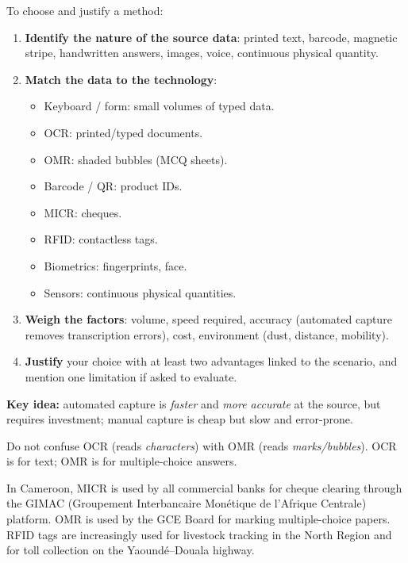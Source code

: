 \documentclass[11pt]{article}
\newcommand{\cle}[1]{{\popxbold\color{popdark}#1}}
\begin{document}
\begin{methode}
To choose and justify a method:
\begin{enumerate}
\item \textbf{Identify the nature of the source data}: printed text, barcode, magnetic stripe, handwritten answers, images, voice, continuous physical quantity.
\item \textbf{Match the data to the technology}:
\begin{itemize}
\item \cle{Keyboard / form}: small volumes of typed data.
\item \cle{OCR}: printed/typed documents.
\item \cle{OMR}: shaded bubbles (MCQ sheets).
\item \cle{Barcode / QR}: product IDs.
\item \cle{MICR}: cheques.
\item \cle{RFID}: contactless tags.
\item \cle{Biometrics}: fingerprints, face.
\item \cle{Sensors}: continuous physical quantities.
\end{itemize}
\item \textbf{Weigh the factors}: volume, speed required, accuracy (automated capture removes transcription errors), cost, environment (dust, distance, mobility).
\item \textbf{Justify} your choice with at least two advantages linked to the scenario, and mention one limitation if asked to evaluate.
\end{enumerate}
\textbf{Key idea:} automated capture is \emph{faster} and \emph{more accurate} at the source, but requires investment; manual capture is cheap but slow and error-prone.
\end{methode}

\begin{attention}
Do not confuse \cle{OCR} (reads \emph{characters}) with \cle{OMR} (reads \emph{marks/bubbles}). OCR is for text; OMR is for multiple-choice answers.
\end{attention}

\begin{savaistu}
In Cameroon, \cle{MICR} is used by all commercial banks for cheque clearing through the GIMAC (Groupement Interbancaire Monétique de l'Afrique Centrale) platform. \cle{OMR} is used by the GCE Board for marking multiple-choice papers. \cle{RFID} tags are increasingly used for livestock tracking in the North Region and for toll collection on the Yaoundé–Douala highway.
\end{savaistu}
\end{document}
